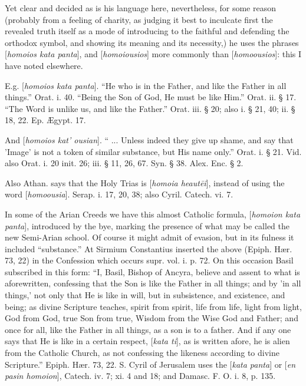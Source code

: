 Yet clear and decided as is his language here,
nevertheless, for some reason (probably from a feeling of charity, as
judging it best to inculcate first the revealed truth itself as a mode
of introducing to the faithful and defending the orthodox
symbol, and showing its meaning and its necessity,) he uses the
phrases [\emph{homoios kata panta}], and [\emph{homoiousios}] more
commonly than [\emph{homoousios}]: this I have noted elsewhere.

E.g. [\emph{homoios kata panta}]. ``He who is in
the Father, and like the Father in all things.'' Orat. i. 40. ``Being
the Son of God, He must be like Him.'' Orat. ii. § 17. ``The Word is
unlike us, and like the Father.'' Orat. iii. § 20; also i. § 21, 40;
ii. § 18, 22. Ep. Ægypt. 17.

And [\emph{homoios kat' ousian}]. `` ... Unless indeed they give up shame, and say that
'Image' is not a token of similar substance, but His name only.'' Orat.
i. § 21. Vid. also Orat. i. 20 init. 26; iii. § 11, 26, 67. Syn. §
38. Alex. Enc. § 2.

Also Athan. says that the Holy Trias is [\emph{homoia
heaut\={e}i}], instead of using the word [\emph{homoousia}].
Serap. i. 17, 20, 38; also Cyril. Catech. vi. 7.

In some of the Arian Creeds we have this almost
Catholic formula, [\emph{homoion kata panta}], introduced by the bye,
marking the presence of what may be called the new Semi-Arian school.
Of course it might admit of evasion, but in its fulness it included ``substance.''
At Sirmium Constantius inserted the above (Epiph. Hær. 73, 22) in the
Confession which occurs supr. vol. i. p. 72. On this occasion Basil
subscribed in this form: ``I, Basil, Bishop of Ancyra, believe and
assent to what is aforewritten, confessing that the Son is like the
Father in all things; and by 'in all things,' not only that He is like
in will, but in subsistence, and existence, and being; as divine
Scripture teaches, spirit from spirit, life from life, light
from light, God from God, true Son from true, Wisdom from the Wise God
and Father; and once for all, like the Father in all things, as a son
is to a father. And if any one says that He is like in a certain
respect, [\emph{kata ti}], as is written afore, he is alien from the
Catholic Church, as not confessing the likeness according to divine
Scripture.'' Epiph. Hær. 73, 22. S. Cyril of Jerusalem uses the [\emph{kata
panta}] or [\emph{en pasin homoion}], Catech. iv. 7; xi. 4 and 18;
and Damasc. F. O. i. 8, p. 135.

